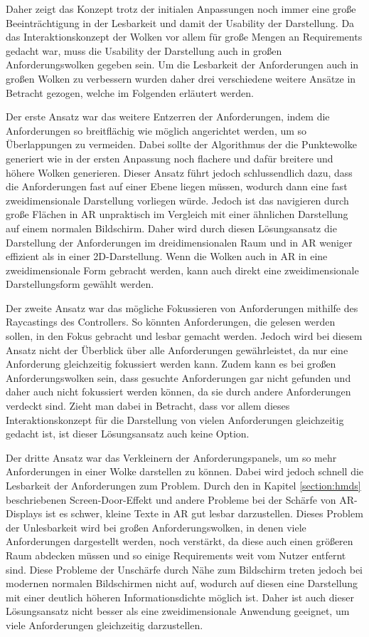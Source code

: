 Daher zeigt das Konzept trotz der initialen Anpassungen noch immer eine große Beeinträchtigung in der Lesbarkeit und damit der Usability der Darstellung.
Da das Interaktionskonzept der Wolken vor allem für große Mengen an Requirements gedacht war, muss die Usability der Darstellung auch in großen Anforderungswolken gegeben sein.
Um die Lesbarkeit der Anforderungen auch in großen Wolken zu verbessern wurden daher drei verschiedene weitere Ansätze in Betracht gezogen, welche im Folgenden erläutert werden.

Der erste Ansatz war das weitere Entzerren der Anforderungen, indem die Anforderungen so breitflächig wie möglich angerichtet werden, um so Überlappungen zu vermeiden.
Dabei sollte der Algorithmus der die Punktewolke generiert wie in der ersten Anpassung noch flachere und dafür breitere und höhere Wolken generieren.
Dieser Ansatz führt jedoch schlussendlich dazu, dass die Anforderungen fast auf einer Ebene liegen müssen, wodurch dann eine fast zweidimensionale Darstellung vorliegen würde.
Jedoch ist das navigieren durch große Flächen in AR unpraktisch im Vergleich mit einer ähnlichen Darstellung auf einem normalen Bildschirm.
Daher wird durch diesen Lösungsansatz die Darstellung der Anforderungen im dreidimensionalen Raum und in AR weniger effizient als in einer 2D-Darstellung.
Wenn die Wolken auch in AR in eine zweidimensionale Form gebracht werden, kann auch direkt eine zweidimensionale Darstellungsform gewählt werden.

Der zweite Ansatz war das mögliche Fokussieren von Anforderungen mithilfe des Raycastings des Controllers.
So könnten Anforderungen, die gelesen werden sollen, in den Fokus gebracht und lesbar gemacht werden.
Jedoch wird bei diesem Ansatz nicht der Überblick über alle Anforderungen gewährleistet, da nur eine Anforderung gleichzeitig fokussiert werden kann.
Zudem kann es bei großen Anforderungswolken sein, dass gesuchte Anforderungen gar nicht gefunden und daher auch nicht fokussiert werden können, da sie durch andere Anforderungen verdeckt sind.
Zieht man dabei in Betracht, dass vor allem dieses Interaktionskonzept für die Darstellung von vielen Anforderungen gleichzeitig gedacht ist, ist dieser Lösungsansatz auch keine Option.

Der dritte Ansatz war das Verkleinern der Anforderungspanels, um so mehr Anforderungen in einer Wolke darstellen zu können.
Dabei wird jedoch schnell die Lesbarkeit der Anforderungen zum Problem.
Durch den in Kapitel \ref{section:hmds} beschriebenen Screen-Door-Effekt und andere Probleme bei der Schärfe von AR-Displays ist es schwer, kleine Texte in AR gut lesbar darzustellen.
Dieses Problem der Unlesbarkeit wird bei großen Anforderungswolken, in denen viele Anforderungen dargestellt werden, noch verstärkt, da diese auch einen größeren Raum abdecken müssen und so einige Requirements weit vom Nutzer entfernt sind.
Diese Probleme der Unschärfe durch Nähe zum Bildschirm treten jedoch bei modernen normalen Bildschirmen nicht auf, wodurch auf diesen eine Darstellung mit einer deutlich höheren Informationsdichte möglich ist.
Daher ist auch dieser Lösungsansatz nicht besser als eine zweidimensionale Anwendung geeignet, um viele Anforderungen gleichzeitig darzustellen.

